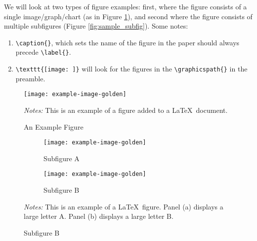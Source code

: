 
We will look at two types of figure examples: first, where the figure consists of a single image/graph/chart (as in Figure \ref{fig:sample_fig}), and second where the figure consists of multiple subfigures (Figure \ref{fig:sample_subfig}). Some notes:

\begin{enumerate}
\item \Verb"\caption{}", which sets the name of the figure in the paper should always precede \Verb"\label{}".
\item \Verb"\texttt{[image: ]}" will look for the figures in the \Verb"\graphicspath{}" in the preamble.
\end{enumerate}


\begin{figure}[bh!tp]
\caption{An Example Figure}
\label{fig:sample_fig}
\vspace{-1em}
\begin{center}
	\texttt{[image: example-image-golden]}
\end{center}

{\footnotesize\textit{Notes:} This is an example of a figure added to a \LaTeX~document. 
 \par}

\end{figure}


\begin{figure}[htbp!]
\caption{An Example Figure with Subfigures}
\label{fig:sample_subfig}
\vspace{-1em}
\begin{center}
\begin{subfigure}{0.49\textwidth}
\caption{Subfigure A}
\centering
\texttt{[image: example-image-golden]}
\end{subfigure}
\begin{subfigure}{0.49\textwidth}
\caption{Subfigure B}
\centering
\texttt{[image: example-image-golden]}

\end{subfigure}
\end{center}
{\footnotesize \textit{Notes:} 
This is an example of a \LaTeX~figure. 
Panel (a) displays a large letter A. Panel (b) displays a large letter B.
\par}
\end{figure}
